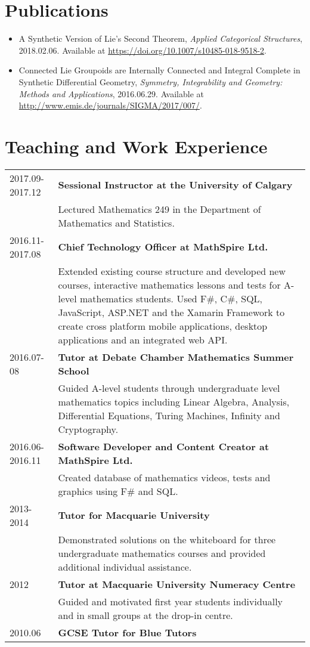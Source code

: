 \documentclass[10pt]{article}
\begin{document}
\section*{Publications}
\begin{itemize}
    \item A Synthetic Version of Lie's Second Theorem, \emph{Applied Categorical Structures}, 2018.02.06. Available at \url{https://doi.org/10.1007/s10485-018-9518-2}.
    \item Connected Lie Groupoids are Internally Connected and Integral Complete in Synthetic Differential Geometry, \emph{Symmetry, Integrability and Geometry: Methods and Applications}, 2016.06.29. Available at \url{http://www.emis.de/journals/SIGMA/2017/007/}.
\end{itemize}

\section*{Teaching and Work Experience}
\begin{tabu}{X[1]X[5]}
    2017.09-2017.12 & \bf{Sessional Instructor at the University of Calgary}\\
        {} & Lectured Mathematics 249 in the Department of Mathematics and Statistics.\\
    2016.11-2017.08 & \bf{Chief Technology Officer at MathSpire Ltd.}\\
        {} & Extended existing course structure and developed new courses, interactive mathematics lessons and tests for A-level mathematics students. Used F\#, C\#, SQL, JavaScript, ASP.NET and the Xamarin Framework to create cross platform mobile applications, desktop applications and an integrated web API.\\
    2016.07-08 & \bf{Tutor at Debate Chamber Mathematics Summer School}\\
        {} & Guided A-level students through undergraduate level mathematics topics including Linear Algebra, Analysis, Differential Equations, Turing Machines, Infinity and Cryptography.\\
    2016.06-2016.11 & \bf{Software Developer and Content Creator at MathSpire Ltd.}\\
        {} & Created database of mathematics videos, tests and graphics using F\# and SQL.\\
    2013-2014 & \bf{Tutor for Macquarie University}\\
        {} & Demonstrated solutions on the whiteboard for three undergraduate mathematics courses and provided additional individual assistance.\\
    2012 & \bf{Tutor at Macquarie University Numeracy Centre}\\
        {} & Guided and motivated first year students individually and in small groups at the drop-in centre.\\
    2010.06 & \bf{GCSE Tutor for Blue Tutors}\\
\end{tabu}
\end{document}

